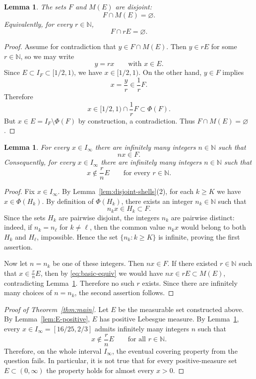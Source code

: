 \documentclass[11pt]{article}
\newtheorem{lemma}[theorem]{Lemma}
\theoremstyle{remark}
\newcommand{\N}{\mathbb{N}}
\begin{document}
\begin{lemma}\label{lem:F-disjoint-ME}
  The sets $F$ and $M(E)$ are disjoint:
  \[
    F\cap M(E)=\varnothing.
  \]
  Equivalently, for every $r\in \N$,
  \[
    F\cap rE=\varnothing.
  \]
\end{lemma}

\begin{proof}
  Assume for contradiction that $y\in F\cap M(E)$. Then $y\in rE$ for some $r\in \N$, so we may write
  \[
    y=rx
    \qquad\text{with }x\in E.
  \]
  Since $E\subset I_F\subset [1/2,1)$, we have $x\in [1/2,1)$. On the other hand, $y\in F$ implies
  \[
    x=\frac{y}{r}\in \frac1r F.
  \]
  Therefore
  \[
    x\in [1/2,1)\cap \frac1r F\subset \Phi(F).
  \]
  But $x\in E=I_F\setminus \Phi(F)$ by construction, a contradiction. Thus $F\cap M(E)=\varnothing$.
\end{proof}

\begin{lemma}\label{lem:bad-n}
  For every $x\in I_\infty$ there are infinitely many integers $n\in \N$ such that
  \[
    nx\in F.
  \]
  Consequently, for every $x\in I_\infty$ there are infinitely many integers $n\in \N$ such that
  \[
    x\notin \frac{r}{n}E\qquad\text{for every }r\in \N.
  \]
\end{lemma}

\begin{proof}
  Fix $x\in I_\infty$. By Lemma~\ref{lem:disjoint-shells}(2), for each $k\ge K$ we have $x\in \Phi(H_k)$. By definition of $\Phi(H_k)$, there exists an integer $n_k\in \N$ such that
  \[
    n_kx\in H_k\subset F.
  \]
  Since the sets $H_k$ are pairwise disjoint, the integers $n_k$ are pairwise distinct: indeed, if $n_k=n_{\ell}$ for $k\ne \ell$, then the common value $n_kx$ would belong to both $H_k$ and $H_{\ell}$, impossible. Hence the set $\{n_k:k\ge K\}$ is infinite, proving the first assertion.

  Now let $n=n_k$ be one of these integers. Then $nx\in F$. If there existed $r\in \N$ such that $x\in \frac{r}{n}E$, then by \eqref{eq:basic-equiv} we would have $nx\in rE\subset M(E)$, contradicting Lemma~\ref{lem:F-disjoint-ME}. Therefore no such $r$ exists. Since there are infinitely many choices of $n=n_k$, the second assertion follows.
\end{proof}

\begin{proof}[Proof of Theorem~\ref{thm:main}]
  Let $E$ be the measurable set constructed above. By Lemma~\ref{lem:E-positive}, $E$ has positive Lebesgue measure. By Lemma~\ref{lem:bad-n}, every $x\in I_\infty=[16/25,2/3]$ admits infinitely many integers $n$ such that
  \[
    x\notin \frac{r}{n}E\qquad\text{for all }r\in \N.
  \]
  Therefore, on the whole interval $I_\infty$, the eventual covering property from the question fails. In particular, it is not true that for every positive-measure set $E\subset (0,\infty)$ the property holds for almost every $x>0$.
\end{proof}
\end{document}
